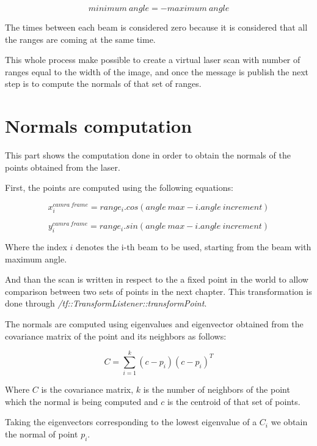 \documentclass[10pt,a4paper,final]{report}
\begin{document}
\begin{equation}
minimum \ angle = - maximum \ angle
\end{equation}

The times between each beam is considered zero because it is considered that all the ranges are coming at the same time.

This whole process make possible to create a virtual laser scan with number of ranges equal to the width of the image, and once the message is publish the next step is to compute the normals of that set of ranges.

\section{Normals computation}

This part shows the computation done in order to obtain the normals of the points obtained from the laser.

First, the points are computed using the following equations:

\begin{equation}
x_{i}^{camra \ frame} = range_{i}.cos(angle \ max - i.angle \ increment)
\end{equation}

\begin{equation}
y_{i}^{camra \ frame} = range_{i}.sin(angle \ max - i.angle \ increment)
\end{equation}

Where the index $i$ denotes the i-th beam to be used, starting from the beam with maximum angle.

And than the scan is written in respect to the a fixed point in the world to allow comparison between two sets of points in the next chapter. This transformation is done through  \textit{/tf::TransformListener::transformPoint}.

The normals are computed using eigenvalues and eigenvector obtained from the covariance matrix of the point and its neighbors as follows:

\begin{equation}
C = \sum_{i=1}^{k}(c - p_{i})(c - p_{i})^T
\end{equation}

Where $C$ is the covariance matrix, $k$ is the number of neighbors of the point which the normal is being computed and $c$ is the centroid of that set of points.

Taking the eigenvectors corresponding to the lowest eigenvalue of a $C_{i}$ we obtain the normal of point $p_{i}$.
\end{document}

